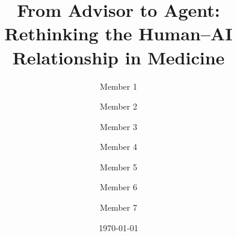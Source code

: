 \documentclass[]{uiuc_paper}
\title{From Advisor to Agent: Rethinking the Human--AI Relationship in Medicine}
\author[1]{Member 1}
\author[1]{Member 2}
\author[1]{Member 3}
\author[1]{Member 4}
\author[1]{Member 5}
\author[1]{Member 6}
\author[1]{Member 7}
\affiliation[1]{Southeast University}
\date{\today}
\newcommand{\method}{MethodName\xspace}
\newif\ifshowbib
\begin{document}
\newtheorem{theorem}{Theorem}[section]
\newtheorem{proposition}[theorem]{Proposition}
\newtheorem{lemma}[theorem]{Lemma}
\newtheorem{corollary}[theorem]{Corollary}
\newtheorem{definition}[theorem]{Definition}
\newtheorem{assumption}[theorem]{Assumption}
\newtheorem{remark}[theorem]{Remark}

\maketitle








\ifshowbib
  \clearpage
  
  
\fi

% 

\end{document}
